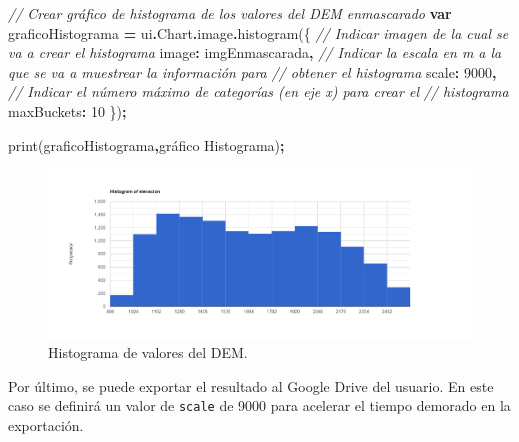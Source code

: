 \documentclass[
  12pt,
  letterpaper,
  twoside]{book}
\newenvironment{Shaded}{\begin{snugshade}}{\end{snugshade}}
\newcommand{\AttributeTok}[1]{\textcolor[rgb]{0.77,0.63,0.00}{#1}}
\newcommand{\CommentTok}[1]{\textcolor[rgb]{0.56,0.35,0.01}{\textit{#1}}}
\newcommand{\DataTypeTok}[1]{\textcolor[rgb]{0.13,0.29,0.53}{#1}}
\newcommand{\DecValTok}[1]{\textcolor[rgb]{0.00,0.00,0.81}{#1}}
\newcommand{\FunctionTok}[1]{\textcolor[rgb]{0.00,0.00,0.00}{#1}}
\newcommand{\KeywordTok}[1]{\textcolor[rgb]{0.13,0.29,0.53}{\textbf{#1}}}
\newcommand{\NormalTok}[1]{#1}
\newcommand{\OperatorTok}[1]{\textcolor[rgb]{0.81,0.36,0.00}{\textbf{#1}}}
\newcommand{\StringTok}[1]{\textcolor[rgb]{0.31,0.60,0.02}{#1}}
\begin{document}
\begin{Shaded}
\begin{Highlighting}[]
\CommentTok{// Crear gráfico de histograma de los valores del DEM enmascarado}
\KeywordTok{var}\NormalTok{ graficoHistograma }\OperatorTok{=}\NormalTok{ ui}\OperatorTok{.}\AttributeTok{Chart}\OperatorTok{.}\AttributeTok{image}\OperatorTok{.}\FunctionTok{histogram}\NormalTok{(\{}
     \CommentTok{// Indicar imagen de la cual se va a crear el histograma  }
  \DataTypeTok{image}\OperatorTok{:}\NormalTok{ imgEnmascarada}\OperatorTok{,}
  \CommentTok{// Indicar la escala en m a la que se va a muestrear la información para  }
  \CommentTok{// obtener el histograma}
  \DataTypeTok{scale}\OperatorTok{:} \DecValTok{9000}\OperatorTok{,}
  \CommentTok{// Indicar el número máximo de categorías (en eje x) para crear el }
  \CommentTok{// histograma}
  \DataTypeTok{maxBuckets}\OperatorTok{:} \DecValTok{10}
\NormalTok{  \})}\OperatorTok{;}

\FunctionTok{print}\NormalTok{(graficoHistograma}\OperatorTok{,}\StringTok{\textquotesingle{}gráfico Histograma\textquotesingle{}}\NormalTok{)}\OperatorTok{;}
\end{Highlighting}
\end{Shaded}

\begin{figure}[btp]

{\centering \includegraphics[width=1\linewidth]{Img/histElevacion} 

}

\caption{Histograma de valores del DEM.}\label{fig:unnamed-chunk-127}
\end{figure}

Por último, se puede exportar el resultado al Google Drive del usuario. En este caso se definirá un valor de \texttt{scale} de 9000 para acelerar el tiempo demorado en la exportación.
\end{document}
